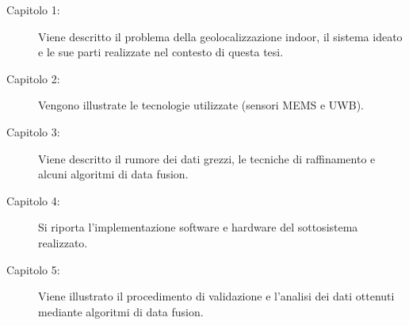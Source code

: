 \begin{description}
\item [Capitolo 1:] Viene descritto il problema della geolocalizzazione indoor, il sistema ideato e le sue parti realizzate nel contesto di questa tesi.
\item [Capitolo 2:] Vengono illustrate le tecnologie utilizzate (sensori MEMS e UWB).
\item [Capitolo 3:] Viene descritto il rumore dei dati grezzi, le tecniche di raffinamento e alcuni algoritmi di data fusion.
\item [Capitolo 4:] Si riporta l'implementazione software e hardware del sottosistema realizzato.
\item [Capitolo 5:] Viene illustrato il procedimento di validazione e l'analisi dei dati ottenuti mediante algoritmi di data fusion.
\end{description}